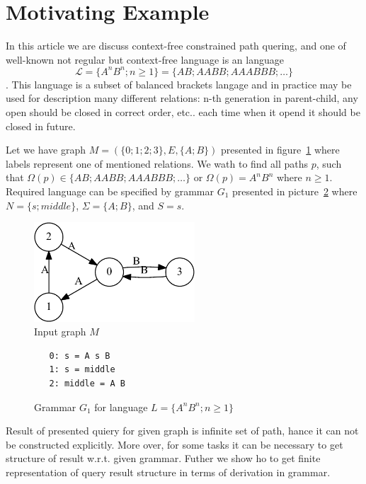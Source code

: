 \section{Motivating Example}

In this article we are discuss context-free constrained path quering, and one of well-known not regular but context-free language is an 
language $$\mathcal{L} = \{A^n B^n; n \geq 1\} = \{AB; AABB; AAABBB; \dots\}$$.
This language is a subset of balanced brackets langage and in practice may be used for description many different relations: n-th generation in parent-child, any open should be closed in correct order, etc.. 
each time when it opend it should be closed in future.

Let we have graph $M=(\{0;1;2;3\},E,\{A;B\})$ presented in figure~\ref{input} where labels represent one of mentioned relations.
We wath to find all paths $p$, such that $\Omega(p) \in \{AB; AABB; AAABBB; \dots\}$ or $\Omega(p) = A^n B^n$ where $n \geq 1$.
Required language can be specified by grammar $G_1$ presented in picture~\ref{grammarG} where $N = \{s; middle\}$, $\Sigma = \{A; B\}$, and $S = s$.

\begin{figure}[h]
    \begin{center}
        \includegraphics[width=6cm]{dot/input.pdf}
        \caption{Input graph $M$}
        \label{input}        
    \end{center}
\end{figure}

\begin{figure}[h]
   \begin{center}
\begin{verbatim}
   0: s = A s B 
   1: s = middle
   2: middle = A B
\end{verbatim}
   \caption{Grammar $G_1$ for language $L=\{A^n B^n; n \geq 1\}$}
   \label{grammarG}        
   \end{center}
\end{figure}

Result of presented quiery for given graph is infinite set of path, hance it can not be constructed explicitly. 
More over, for some tasks it can be necessary to get structure of result w.r.t. given grammar.
Futher we show ho to get finite representation of query result structure in terms of derivation in grammar.
